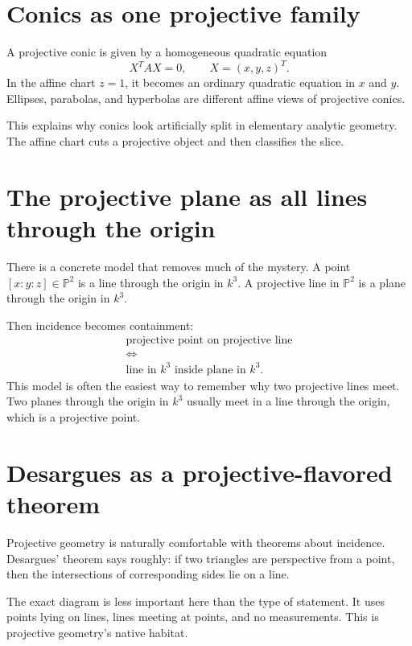\section{Conics as one projective family}

A projective conic is given by a homogeneous quadratic equation
\[
  X^TAX=0,
  \qquad
  X=(x,y,z)^T.
\]
In the affine chart \(z=1\), it becomes an ordinary quadratic equation in \(x\) and \(y\). Ellipses, parabolas, and hyperbolas are different affine views of projective conics.

This explains why conics look artificially split in elementary analytic geometry. The affine chart cuts a projective object and then classifies the slice.


\section{The projective plane as all lines through the origin}

There is a concrete model that removes much of the mystery.  A point \([x:y:z]\in\mathbb P^2\) is a line through the origin in \(k^3\).  A projective line in \(\mathbb P^2\) is a plane through the origin in \(k^3\).

Then incidence becomes containment:
\[
\begin{array}{c}
  \text{projective point on projective line}\\
  \Longleftrightarrow\\
  \text{line in }k^3\text{ inside plane in }k^3.
\end{array}
\]
This model is often the easiest way to remember why two projective lines meet.  Two planes through the origin in \(k^3\) usually meet in a line through the origin, which is a projective point.

\section{Desargues as a projective-flavored theorem}

Projective geometry is naturally comfortable with theorems about incidence.  Desargues' theorem says roughly: if two triangles are perspective from a point, then the intersections of corresponding sides lie on a line.

The exact diagram is less important here than the type of statement.  It uses points lying on lines, lines meeting at points, and no measurements.  This is projective geometry's native habitat.

